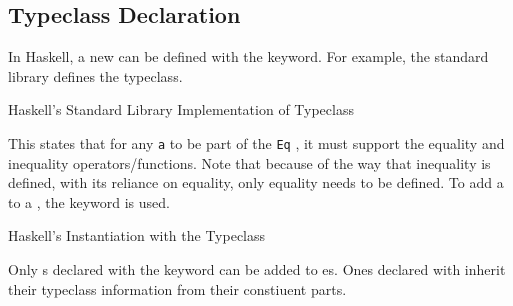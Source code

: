 \subsection{Typeclass Declaration}\label{subsec:Typeclass_Declaration}
In Haskell, a new  can be defined with the  keyword.
For example, the standard library defines the  typeclass.

\begin{listing}[h!tbp]
\caption{Haskell's Standard Library Implementation of  Typeclass}
\label{lst:Eq_Typeclass_Definition}
\end{listing}

This states that for any  \texttt{a} to be part of the \texttt{Eq} , it must support the equality and inequality operators/functions.
Note that because of the way that inequality is defined, with its reliance on equality, only equality needs to be defined.
To add a  to a , the  keyword is used.

\begin{listing}[h!tbp]
\caption{Haskell's  Instantiation with the  Typeclass}
\label{lst:Eq_Typeclass_Instance}
\end{listing}

Only s declared with the  keyword can be added to es.
Ones declared with  inherit their typeclass information from their constiuent parts.


